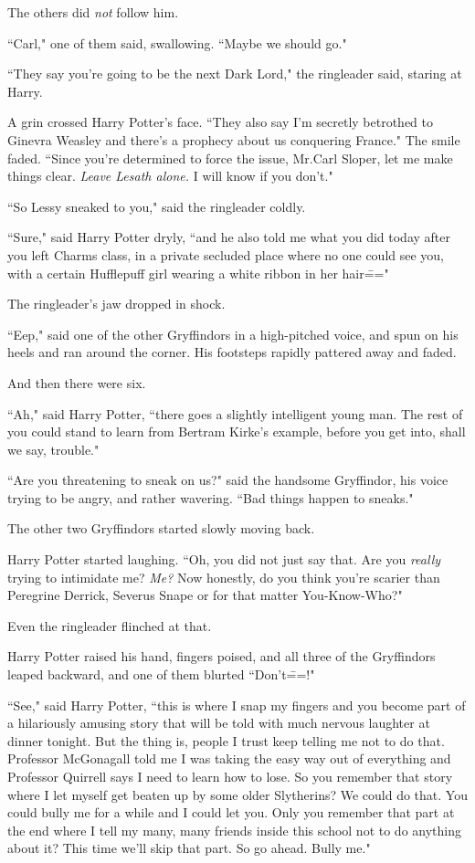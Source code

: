 The others did \emph{not} follow him.

``Carl," one of them said, swallowing. ``Maybe we should go."

``They say you're going to be the next Dark Lord," the ringleader said, staring at Harry.

A grin crossed Harry Potter's face. ``They also say I'm secretly betrothed to Ginevra Weasley and there's a prophecy about us conquering France." The smile faded. ``Since you're determined to force the issue, Mr.\?Carl Sloper, let me make things clear. \emph{Leave Lesath alone.} I will know if you don't."

``So Lessy sneaked to you," said the ringleader coldly.

``Sure," said Harry Potter dryly, ``and he also told me what you did today after you left Charms class, in a private secluded place where no one could see you, with a certain Hufflepuff girl wearing a white ribbon in her hair\==="

The ringleader's jaw dropped in shock.

``Eep," said one of the other Gryffindors in a high-pitched voice, and spun on his heels and ran around the corner. His footsteps rapidly pattered away and faded.

And then there were six.

``Ah," said Harry Potter, ``there goes a slightly intelligent young man. The rest of you could stand to learn from Bertram Kirke's example, before you get into, shall we say, trouble."

``Are you threatening to sneak on us?" said the handsome Gryffindor, his voice trying to be angry, and rather wavering. ``Bad things happen to sneaks."

The other two Gryffindors started slowly moving back.

Harry Potter started laughing. ``Oh, you did not just say that. Are you \emph{really} trying to intimidate me? \emph{Me?} Now honestly, do you think you're scarier than Peregrine Derrick, Severus Snape or for that matter You-Know-Who?"

Even the ringleader flinched at that.

Harry Potter raised his hand, fingers poised, and all three of the Gryffindors leaped backward, and one of them blurted ``Don't\===!"

``See," said Harry Potter, ``this is where I snap my fingers and you become part of a hilariously amusing story that will be told with much nervous laughter at dinner tonight. But the thing is, people I trust keep telling me not to do that. Professor McGonagall told me I was taking the easy way out of everything and Professor Quirrell says I need to learn how to lose. So you remember that story where I let myself get beaten up by some older Slytherins? We could do that. You could bully me for a while and I could let you. Only you remember that part at the end where I tell my many, many friends inside this school not to do anything about it? This time we'll skip that part. So go ahead. Bully me."

